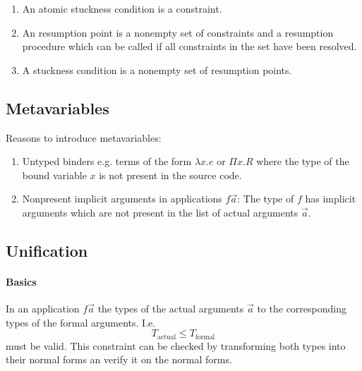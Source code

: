 \begin{enumerate}
    \item
        An atomic stuckness condition is a constraint.

    \item An resumption point is a nonempty set of constraints and a
        resumption procedure which can be called if all constraints in the set
        have been resolved.

    \item A stuckness condition is a nonempty set of resumption points.
\end{enumerate}






\subsection{Metavariables}

Reasons to introduce metavariables:
\begin{enumerate}

    \item Untyped binders e.g. terms of the form $\lambda x. e$ or $\Pi x. R$
        where the type of the bound variable $x$ is not present in the source
        code.

    \item Nonpresent implicit arguments in applications $f \vec a$: The type of
        $f$ has implicit arguments which are not present in the list of actual
        arguments $\vec a$.
\end{enumerate}




\subsection{Unification}


\paragraph{Basics}

In an application $f \vec a$ the types of the actual arguments $\vec a$ to the
corresponding types of the formal arguments. I.e.
$$
    T_\text{actual} \le T_\text{formal}
$$
must be valid. This constraint can be checked by transforming both types into
their normal forms an verify it on the normal forms.

